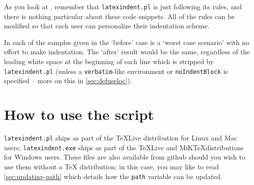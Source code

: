 \documentclass[8pt]{article}
\newenvironment{sidebyside}{\begin{adjustwidth}{-3cm}{1cm}}{\end{adjustwidth}}
\begin{document}
As you look at , remember
that \texttt{latexindent.pl} is just following its rules, and there is nothing
particular about these code snippets. All of the rules can be modified
so that each user can personalize their indentation scheme.

In each of the samples given in 
the `before' case is a `worst case scenario' with no effort to make indentation. The `after'
result would be the same, regardless of the leading white space at the beginning of
each line which is stripped by \texttt{latexindent.pl} (unless a \texttt{verbatim}-like
environment or \texttt{noIndentBlock} is specified -- more on this in \cref{sec:defuseloc}).

\begin{sidebyside}
	\centering
	\begin{minipage}{.55\textwidth}
	\end{minipage}\hfill
	\begin{minipage}{.55\textwidth}
	\end{minipage}%

	\begin{minipage}{.55\textwidth}
	\end{minipage}\hfill
	\begin{minipage}{.55\textwidth}
	\end{minipage}%

	\begin{minipage}{.55\textwidth}
	\end{minipage}\hfill
	\begin{minipage}{.55\textwidth}
	\end{minipage}%
\end{sidebyside}


\section{How to use the script}
\texttt{latexindent.pl} ships as part of the \TeX Live distribution for
Linux and Mac users; \texttt{latexindent.exe} ships as part of the \TeX Live
and MiK\TeX distributions for Windows users. These files are also available
from github \cite{latexindent-home} should you wish to use them without
a \TeX{} distribution; in this case, you may like to read \vref{sec:updating-path}
which details how the \texttt{path} variable can be updated.
\end{document}

